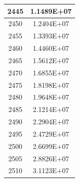 \documentclass[a4paper]{article}
\begin{document}
\begin{tabular}{|c|c|}
		\hline
		2445 & 1.1489E+07 \\
		\hline
		2450 & 1.2404E+07 \\
		\hline
		2455 & 1.3393E+07 \\
		\hline
		2460 & 1.4460E+07 \\
		\hline
		2465 & 1.5612E+07 \\
		\hline
		2470 & 1.6855E+07 \\
		\hline
		2475 & 1.8198E+07 \\
		\hline
		2480 & 1.9648E+07 \\
		\hline
		2485 & 2.1214E+07 \\
		\hline
		2490 & 2.2904E+07 \\
		\hline
		2495 & 2.4729E+07 \\
		\hline
		2500 & 2.6699E+07 \\
		\hline
		2505 & 2.8826E+07 \\
		\hline
		2510 & 3.1123E+07 \\
		\hline
	\end{tabular}
	\hfill
\end{document}
